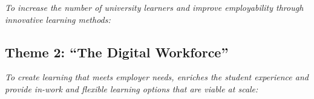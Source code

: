 \documentclass[conference]{IEEEtran}
\begin{document}

{\emph{To increase the number of university learners and improve
employability through innovative learning methods:}}



\subsection*{Theme 2: ``The Digital Workforce''}

{\emph{To create learning that meets employer needs, enriches the
student experience and provide in-work and flexible learning options
that are viable at scale:}}

\end{document}
